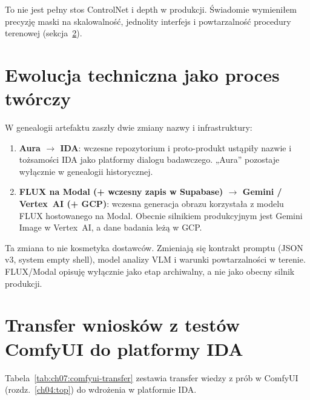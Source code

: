 To nie jest pełny stos ControlNet i depth w produkcji. Świadomie wymieniłem precyzję maski na skalowalność, jednolity interfejs i powtarzalność procedury terenowej (sekcja~\ref{ch07:sec:comfyui-transfer}).

\section{Ewolucja techniczna jako proces twórczy}
\label{ch07:sec:ewolucja}

W genealogii artefaktu zaszły dwie zmiany nazwy i infrastruktury:

\begin{enumerate}
  \item \textbf{Aura $\rightarrow$ IDA}: wczesne repozytorium i proto-produkt ustąpiły nazwie i tożsamości IDA jako platformy dialogu badawczego. „Aura” pozostaje wyłącznie w genealogii historycznej.
  \item \textbf{FLUX na Modal (+ wczesny zapis w Supabase) $\rightarrow$ Gemini / Vertex~AI (+ GCP)}: wczesna generacja obrazu korzystała z modelu FLUX hostowanego na Modal. Obecnie silnikiem produkcyjnym jest Gemini Image w Vertex~AI, a dane badania leżą w GCP.
\end{enumerate}

Ta zmiana to nie kosmetyka dostawców. Zmieniają się kontrakt promptu (JSON v3, system empty shell), model analizy VLM i warunki powtarzalności w terenie. FLUX/Modal opisuję wyłącznie jako etap archiwalny, a nie jako obecny silnik produkcji.

\section{Transfer wniosków z testów ComfyUI do platformy IDA}
\label{ch07:sec:comfyui-transfer}

Tabela~\ref{tab:ch07:comfyui-transfer} zestawia transfer wiedzy z prób w ComfyUI (rozdz.~\ref{ch04:top}) do wdrożenia w platformie IDA.

